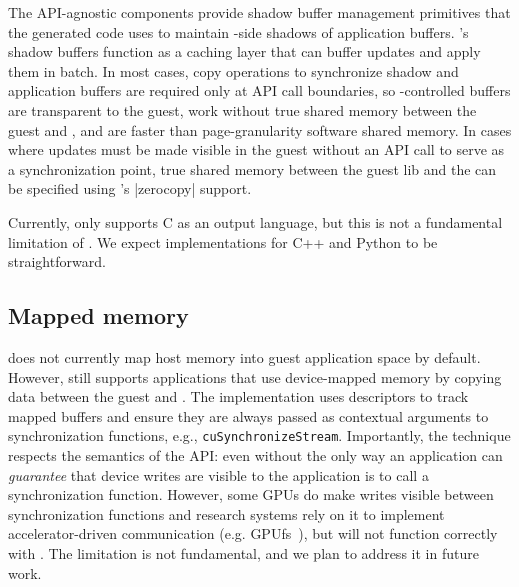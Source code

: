 {The \AvA API-agnostic components provide shadow buffer management primitives that the generated code uses to maintain \worker-side shadows of application buffers.
\AvA's shadow buffers function as a caching layer that can buffer updates and apply them in batch.
In most cases, copy operations to synchronize shadow and application buffers are required only at API call boundaries,
so \AvA-controlled buffers are transparent to the guest, work without true shared memory between the guest and \worker, and are faster than page-granularity software shared memory.
In cases where updates must be made visible in the guest without an API call to serve as a synchronization point,
true shared memory between the guest lib and the \worker can be specified using \Lapis's \spec|zerocopy| support.

Currently, \CAvA only supports C as an output language, but this is not a fundamental limitation of \AvA.
We expect implementations for C++ and Python to be straightforward.

\subsection{Mapped memory}
\label{s:api:mapped-mem}

\AvA does not currently map \worker host memory into guest application space by default.
However, \AvA still supports applications that use device-mapped memory by copying data between the guest and \worker.
The implementation uses \Lapis descriptors to track mapped buffers and ensure they are always
passed as contextual arguments to synchronization functions, e.g., \lstinline|cuSynchronizeStream|.
Importantly, the technique respects the semantics of the API: even without \AvA the only way an application can
\emph{guarantee} that device writes are visible to the application is to call a synchronization function.
However, some GPUs do make writes visible between synchronization functions and
research systems rely on it to implement accelerator-driven communication (e.g. GPUfs~\cite{gpufs}),
but will not function correctly with \AvA. The limitation is not fundamental, and we plan to address
it in future work.

}
